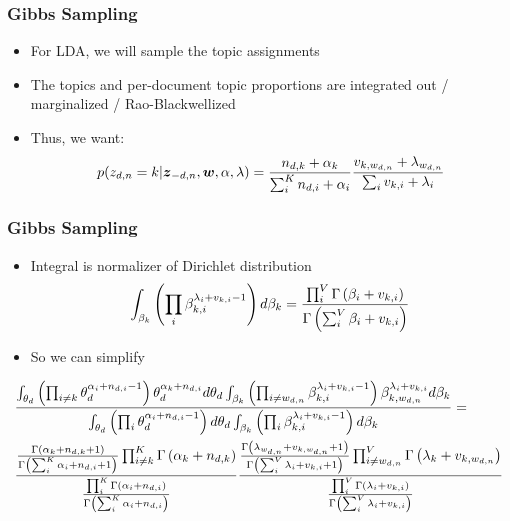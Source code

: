 \documentclass[xcolor=dvipsnames]{beamer}
\newcommand{\bm}[1]{\mbox{\boldmath$#1$}}
\newcommand{\g}[1]{\Gamma \left( #1 \right)}
\begin{document}
\begin{frame}
\frametitle{Gibbs Sampling}
\begin{itemize}
\item For LDA, we will sample the topic assignments
\item The topics and per-document topic proportions are integrated out / marginalized / Rao-Blackwellized
\item Thus, we want:
\begin{equation*}
p(z_{d,n} = k | {\bm z}_{-d,n}, {\bm w}, \alpha, \lambda) = \frac{n_{d, k} + \alpha_k}{ \sum_{i}^{K} { n_{d,i} + \alpha_i}} \frac{v_{k, w_{d,n}} + \lambda_{w_{d,n}}}{ \sum_{i} { v_{k,i} + \lambda_{i} }}
\end{equation*}
\end{itemize}
\end{frame}






\begin{frame}
\frametitle{Gibbs Sampling}
\begin{itemize}
\item Integral is normalizer of Dirichlet distribution
\begin{equation*}
\int_{\beta_{k}}    \left( \prod_{i} \beta_{k,i} ^{ \lambda_i + v_{k,i} - 1} \right) d\beta_k = \dirfunc{i}{V}{\beta_i + v_{k,i}}
\end{equation*}
\pause
\item So we can simplify
\end{itemize}
\begin{footnotesize}
\begin{align*}
& \frac{ \int_{\theta_d} \left( \prod_{i \not = k} \theta_d^{\alpha_i + n_{d,i}
      - 1} \right)\theta_d^{\alpha_k + n_{d,i} } d\theta_d \int_{\beta_{k}}
  \left( \prod_{i \not = w_{d,n}} \beta_{k,i} ^{ \lambda_i + v_{k,i} - 1}
  \right) \beta_{k, w_{d,n}}^{\lambda_i + v_{k,i}} d\beta_k } { \int_{\theta_d}
  \left( \prod_{i} \theta_d^{\alpha_i + n_{d,i} - 1} \right) d\theta_d
  \int_{\beta_{k}}    \left( \prod_{i} \beta_{k,i} ^{ \lambda_i + v_{k,i} - 1}
  \right) d\beta_k } = \\
& \frac{
  \dirnum{i \not = k}{K}{\alpha_k + n_{d,k} + 1}{ \g{\sum_{i}^{K} \alpha_i +
      n_{d,i} + 1} } \g{\alpha_k + n_{d,k}}  }
{ \dirfunc{i}{K}{\alpha_i + n_{d,i}} }
\frac{
 \dirnum{i \not = w_{d,n}}{V}{\lambda_{w_{d,n}} + v_{k,w_{d,n}} + 1}{ \g{\sum_{i}^{V} \lambda_i + v_{k,i} + 1} } \g{\lambda_k + v_{k,w_{d,n}}}
}{ \dirfunc{i}{V}{\lambda_i + v_{k,i}} } \\
\end{align*}
\end{footnotesize}
\end{frame}
\end{document}
